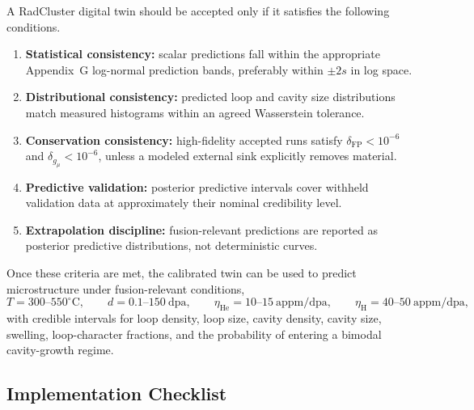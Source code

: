 A RadCluster digital twin should be accepted only if it satisfies the following
conditions.
\begin{enumerate}
    \item \textbf{Statistical consistency:} scalar predictions fall within the
    appropriate Appendix~G log-normal prediction bands, preferably within
    $\pm 2s$ in log space.
    \item \textbf{Distributional consistency:} predicted loop and cavity size
    distributions match measured histograms within an agreed Wasserstein
    tolerance.
    \item \textbf{Conservation consistency:} high-fidelity accepted runs satisfy
    $\delta_{\mathrm{FP}}<10^{-6}$ and $\delta_{g_\mu}<10^{-6}$, unless a
    modeled external sink explicitly removes material.
    \item \textbf{Predictive validation:} posterior predictive intervals cover
    withheld validation data at approximately their nominal credibility level.
    \item \textbf{Extrapolation discipline:} fusion-relevant predictions are
    reported as posterior predictive distributions, not deterministic curves.
\end{enumerate}

Once these criteria are met, the calibrated twin can be used to predict
microstructure under fusion-relevant conditions,
\begin{equation}
    T=300\text{--}550^\circ\mathrm{C},
    \qquad
    d=0.1\text{--}150~\mathrm{dpa},
    \qquad
    \eta_{\mathrm{He}}=10\text{--}15~\mathrm{appm/dpa},
    \qquad
    \eta_{\mathrm{H}}=40\text{--}50~\mathrm{appm/dpa},
\end{equation}
with credible intervals for loop density, loop size, cavity density, cavity
size, swelling, loop-character fractions, and the probability of entering a
bimodal cavity-growth regime.

\subsection{Implementation Checklist}
\label{app:dt_implementation_checklist}

